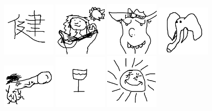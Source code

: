 \includegraphics[width=0.2\textwidth]{art/Safari_74.png}
\includegraphics[width=0.2\textwidth]{art/Safari_75.png}
\includegraphics[width=0.2\textwidth]{art/Safari_76.png}
\includegraphics[width=0.2\textwidth]{art/Safari_77.png}
\includegraphics[width=0.2\textwidth]{art/Safari_78.png}
\includegraphics[width=0.2\textwidth]{art/Safari_8.png}
\includegraphics[width=0.2\textwidth]{art/Safari_9.png}
